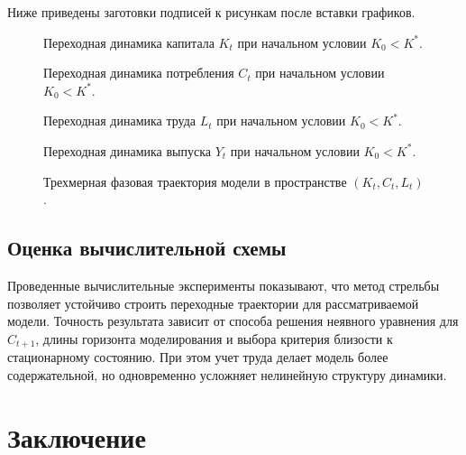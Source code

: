 \documentclass[14pt,a4paper]{extreport}
\begin{document}
    Ниже приведены заготовки подписей к рисункам после вставки графиков.

    \begin{figure}[H]
        \centering
        \fbox{\rule{0pt}{5cm}\rule{0.9\textwidth}{0pt}}
        \caption{Переходная динамика капитала $K_t$ при начальном условии $K_0<K^*$.}
    \end{figure}

    \begin{figure}[H]
        \centering
        \fbox{\rule{0pt}{5cm}\rule{0.9\textwidth}{0pt}}
        \caption{Переходная динамика потребления $C_t$ при начальном условии $K_0<K^*$.}
    \end{figure}

    \begin{figure}[H]
        \centering
        \fbox{\rule{0pt}{5cm}\rule{0.9\textwidth}{0pt}}
        \caption{Переходная динамика труда $L_t$ при начальном условии $K_0<K^*$.}
    \end{figure}

    \begin{figure}[H]
    \centering
    \fbox{\rule{0pt}{5cm}\rule{0.9\textwidth}{0pt}}
    \caption{Переходная динамика выпуска $Y_t$ при начальном условии $K_0<K^*$.}
    \end{figure}

    \begin{figure}[H]
        \centering
        \fbox{\rule{0pt}{5cm}\rule{0.9\textwidth}{0pt}}
        \caption{Трехмерная фазовая траектория модели в пространстве $(K_t,C_t,L_t)$.}
    \end{figure}

    \section{Оценка вычислительной схемы}

    Проведенные вычислительные эксперименты показывают, что метод стрельбы позволяет устойчиво строить переходные траектории для рассматриваемой модели. Точность результата зависит от способа решения неявного уравнения для $C_{t+1}$, длины горизонта моделирования и выбора критерия близости к стационарному состоянию. При этом учет труда делает модель более содержательной, но одновременно усложняет нелинейную структуру динамики.

\chapter{Заключение}
\end{document}
